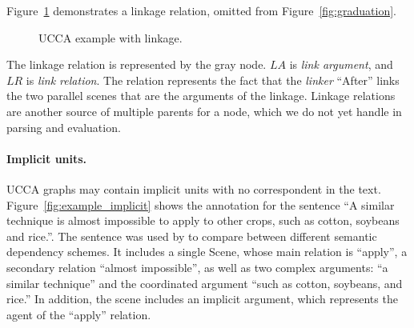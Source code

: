 \documentclass[11pt,a4paper]{article}
\newcommand{\figref}[1]{Figure~\ref{#1}}
\begin{document}
\figref{fig:example_linkage} demonstrates a linkage relation, omitted from \figref{fig:graduation}.

\begin{figure}[H]
  \centering
  \caption{UCCA example with linkage.}
  \label{fig:example_linkage}
\end{figure}

The linkage relation is represented by the gray node.
$LA$ is \emph{link argument}, and $LR$ is \emph{link relation}.
The relation represents the fact that the \emph{linker} ``After'' links the two parallel scenes
that are the arguments of the linkage.
Linkage relations are another source of multiple parents for a node, which we do not yet handle
in parsing and evaluation.

\paragraph{Implicit units.}

UCCA graphs may contain implicit units with no correspondent in the text.
\figref{fig:example_implicit} shows the annotation for the sentence
``A similar technique is almost impossible to apply to other crops, such as cotton, soybeans and rice.''.
The sentence was used by \citet{oepen2015semeval} to compare between different semantic
dependency schemes.
It includes a single Scene, whose main relation is ``apply'', a secondary relation ``almost impossible'', as well as two complex arguments: ``a similar technique'' and the coordinated argument ``such as cotton, soybeans, and rice.''
In addition, the scene includes an implicit argument, which represents the agent of the
``apply'' relation.
\end{document}
